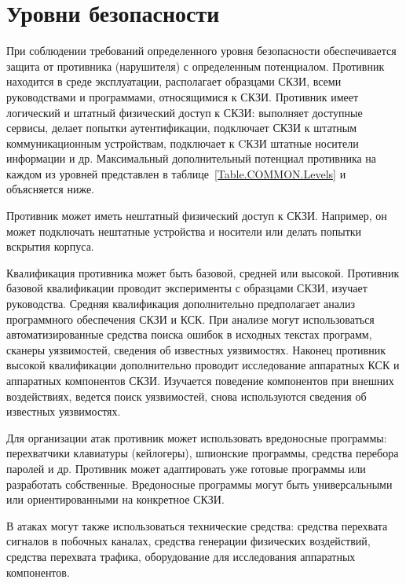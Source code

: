 \section{Уровни безопасности}\label{COMMON.Levels}

При соблюдении требований определенного уровня безопасности обеспечивается
защита от противника (нарушителя) с определенным потенциалом.
%
Противник находится в среде эксплуатации, 
располагает образцами СКЗИ, 
всеми руководствами и программами, относящимися к СКЗИ. 
%
Противник имеет логический и штатный физический доступ к СКЗИ: 
выполняет доступные сервисы, 
делает попытки аутентификации,
подключает СКЗИ к штатным коммуникационным устройствам, 
подключает к CКЗИ штатные носители информации и др. 
%
Максимальный дополнительный потенциал противника на каждом из уровней 
представлен в таблице~\ref{Table.COMMON.Levels} и объясняется ниже.

Противник может иметь нештатный физический доступ к СКЗИ.
Например, он может подключать нештатные устройства и носители или 
делать попытки вскрытия корпуса.

Квалификация противника может быть базовой, средней или высокой.
%
Противник базовой квалификации проводит эксперименты с образцами СКЗИ, 
изучает руководства. 
%
Средняя квалификация дополнительно предполагает анализ программного обеспечения 
СКЗИ и КСК. При анализе могут использоваться автоматизированные средства поиска 
ошибок в исходных текстах программ, сканеры уязвимостей, сведения об известных 
уязвимостях.
%
Наконец противник высокой квалификации дополнительно проводит исследование
аппаратных КСК и аппаратных компонентов СКЗИ. Изучается поведение 
компонентов при внешних воздействиях, ведется поиск уязвимостей, 
снова используются сведения об известных уязвимостях.


Для организации атак противник может использовать вредоносные программы:
перехватчики клавиатуры (кейлогеры), шпионские программы, 
средства перебора паролей и др. 
%
Противник может адаптировать уже готовые программы или разработать собственные. 
%
Вредоносные программы могут быть универсальными или ориентированными на 
конкретное СКЗИ.

В атаках могут также использоваться технические средства: 
средства перехвата сигналов в побочных каналах,
средства генерации физических воздействий,
средства перехвата трафика,
оборудование для исследования аппаратных компонентов.

